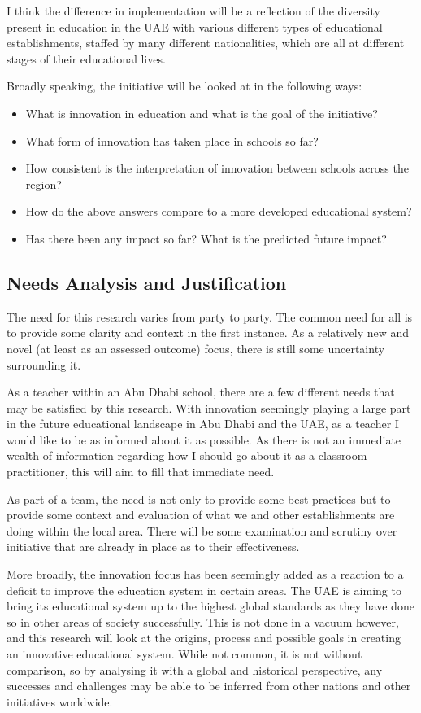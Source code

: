 I think the difference in implementation will be a reflection of the diversity present in education in the UAE with various different types of educational establishments, staffed by many different nationalities, which are all at different stages of their educational lives.

Broadly speaking, the initiative will be looked at in the following ways: 

\begin{itemize}
\item What is innovation in education and what is the goal of the initiative?
\item What form of innovation has taken place in schools so far?
\item How consistent is the interpretation of innovation between schools across the region?
\item How do the above answers compare to a more developed educational system?
\item Has there been any impact so far? What is the predicted future impact?
\end{itemize}

\subsection{Needs Analysis and Justification}

The need for this research varies from party to party. The common need for  all is to provide some clarity and context in the first instance. As a relatively new and novel (at least as an assessed outcome) focus, there is still some uncertainty surrounding it.

As a teacher within an Abu Dhabi school, there are a few different needs that may be satisfied by this research. With innovation seemingly playing a large part in the future educational landscape in Abu Dhabi and the UAE, as a teacher I would like to be as informed about it as possible. As there is not an immediate wealth of information regarding how I should go about it as a classroom practitioner, this will aim to fill that immediate need.

As part of a team, the need is not only to provide some best practices but to provide some context and evaluation of what we and other establishments are doing within the local area. There will be some examination and scrutiny over initiative that are already in place as to their effectiveness.

More broadly, the innovation focus has been seemingly added as a reaction to a deficit to improve the education system in certain areas. The UAE is aiming to bring its educational system up to the highest global standards as they have done so in other areas of society successfully. This is not done in a vacuum however, and this research will look at the origins, process and possible goals in creating an innovative educational system. While not common, it is not without comparison, so by analysing it with a global and historical perspective, any successes and challenges may be able to be inferred from other nations and other initiatives worldwide.


